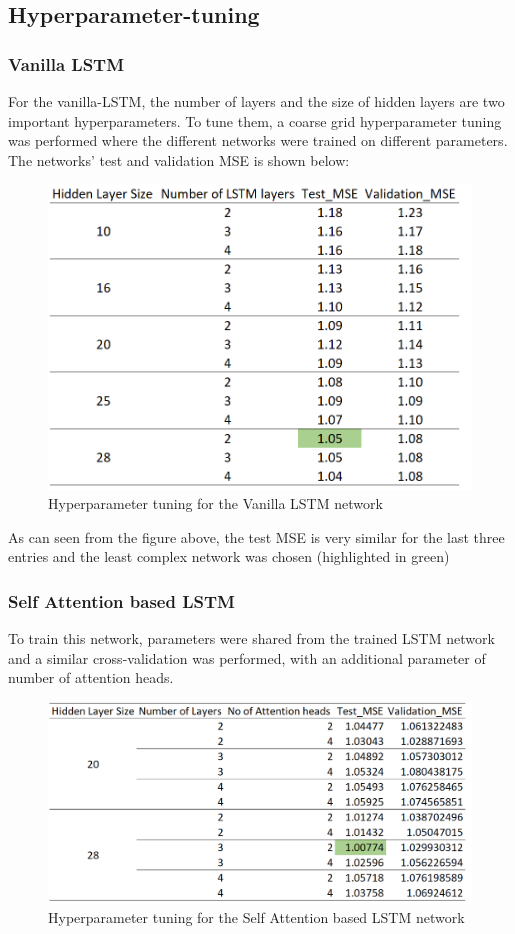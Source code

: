 \documentclass{article}
\begin{document}
\subsection{Hyperparameter-tuning}
\subsubsection{Vanilla LSTM}
For the vanilla-LSTM, the number of layers and the size of hidden layers are two important hyperparameters. To tune them, a coarse grid hyperparameter tuning was performed where the different networks were trained on different parameters. The networks' test and validation MSE is shown below:

\begin{figure}[H]
\centering
\includegraphics[scale=0.5]{result/res1.png}
\caption{Hyperparameter tuning for the Vanilla LSTM network}
\end{figure}

As can seen from the figure above, the test MSE is very similar for the last three entries and the least complex network was chosen (highlighted in green)
\subsubsection{Self Attention based LSTM}
To train this network, parameters were shared from the trained LSTM network and a similar cross-validation was performed, with an additional parameter of number of attention heads.
\begin{figure}[H]
\centering
\includegraphics[scale=0.5]{result/res2.png}
\caption{Hyperparameter tuning for the Self Attention based LSTM network}
\end{figure}
\end{document}
